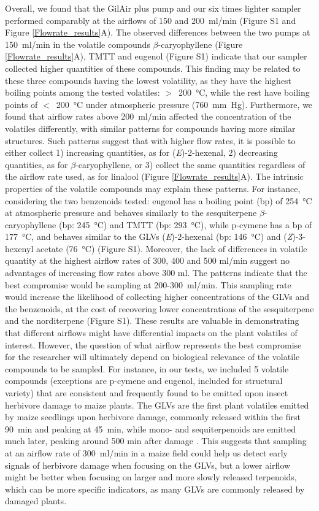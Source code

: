 Overall, we found that the GilAir plus pump and our six times lighter sampler performed comparably at the airflows of 150 and 200~ml/min (Figure S1 and Figure \ref{Flowrate_results}A). The observed differences between the two pumps at 150~ml/min in the volatile compounds $\beta$-caryophyllene (Figure \ref{Flowrate_results}A), TMTT and eugenol (Figure S1) indicate that our sampler collected higher quantities of these compounds. This finding may be related to these three compounds having the lowest volatility, as they have the highest boiling points among the tested volatiles: $>$~200~°C, while the rest have boiling points of $<$~200~°C under atmospheric pressure (760~mm~Hg). 
Furthermore, we found that airflow rates above 200~ml/min affected the concentration of the volatiles differently, with similar patterns for compounds having more similar structures. Such patterns suggest that with higher flow rates, it is possible to either collect 1) increasing quantities, as for (\textit{E})-2-hexenal, 2) decreasing quantities, as for $\beta$-caryophyllene, or 3) collect the same quantities regardless of the airflow rate used, as for linalool (Figure \ref{Flowrate_results}A). The intrinsic properties of the volatile compounds may explain these patterns. For instance, considering the two benzenoids tested: eugenol has a boiling point (bp) of 254~°C at atmospheric pressure and behaves similarly to the sesquiterpene $\beta$-caryophyllene (bp: 245~°C) and TMTT (bp: 293~°C), while p-cymene has a bp of 177~°C, and behaves similar to the GLVs (\textit{E})-2-hexenal (bp: 146~°C) and (\textit{Z})-3-hexenyl acetate (76~°C) (Figure S1). Moreover, the lack of differences in volatile quantity at the highest airflow rates of 300, 400 and 500 ml/min suggest no advantages of increasing flow rates above 300 ml. The patterns indicate that the best compromise would be sampling at 200-300~ml/min. This sampling rate would increase the likelihood of collecting higher concentrations of the GLVs and the benzenoids, at the cost of recovering lower concentrations of the sesquiterpene and the norditerpene (Figure S1). These results are valuable in demonstrating that different airflows might have differential impacts on the plant volatiles of interest. However, the question of what airflow represents the best compromise for the researcher will ultimately depend on biological relevance of the volatile compounds to be sampled. For instance, in our tests, we included 5 volatile compounds (exceptions are p-cymene and eugenol, included for structural variety) that are consistent and frequently found to be emitted upon insect herbivore damage to maize plants. The GLVs are the first plant volatiles emitted by maize seedlings upon herbivore damage, commonly released within the first 90~min and peaking at 45~min, while mono- and sequiterpenoids are emitted much later, peaking around 500 min after damage \cite{erb_indole_2015}. This suggests that sampling at an airflow rate of 300~ml/min in a maize field could help us detect early signals of herbivore damage when focusing on the GLVs, but a lower airflow might be better when focusing on larger and more slowly released terpenoids, which can be more specific indicators, as many GLVs are commonly released by damaged plants. 

